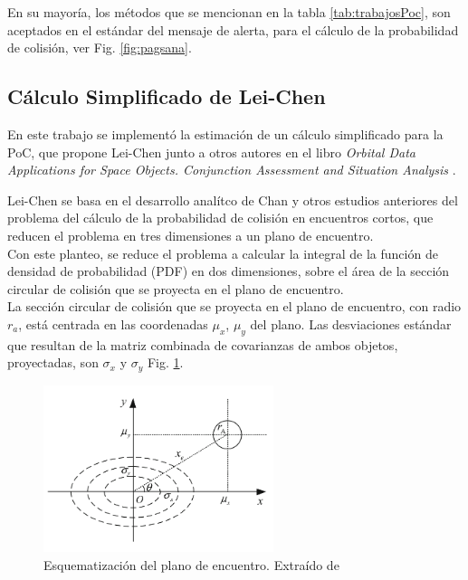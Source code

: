 {En su mayor\'ia, los m\'etodos que se mencionan en la tabla \ref{tab:trabajosPoc}, son aceptados en el est\'andar del mensaje de alerta, para el c\'alculo de la probabilidad de colisi\'on, ver Fig. \ref{fig:pagsana}.

% 
  

\subsection{C\'alculo Simplificado de Lei-Chen}\label{subsec:pocsimp}

En este trabajo se implement\'o la estimaci\'on de un c\'alculo simplificado para la PoC, que propone Lei-Chen junto a otros autores en el libro 
{\it{Orbital Data Applications for Space Objects. Conjunction Assessment and Situation Analysis}} \citep{leichen}.

Lei-Chen se basa en el desarrollo anal\'itco de Chan \citep{chan2003improved} y otros estudios anteriores del problema del c\'alculo de la probabilidad de colisi\'on en encuentros cortos, que reducen el problema en tres dimensiones a un plano de encuentro.\\
Con este planteo, se reduce el problema a calcular la integral de la funci\'on de densidad de probabilidad (PDF) en dos dimensiones, sobre el \'area de la secci\'on circular de colisi\'on que se proyecta en el plano de encuentro.\\

La secci\'on circular de colisi\'on que se proyecta en el plano de encuentro, con radio $r_{a}$, est\'a centrada en las coordenadas $\mu_{x}$, $\mu_{y}$ del plano. Las desviaciones est\'andar que resultan de la matriz combinada de covarianzas de ambos objetos, proyectadas, son $\sigma_{x}$ y $\sigma_{y}$ Fig. \ref{fig:planoenc}.\\

\begin{figure}[!h]
\centering
\includegraphics[width=0.6\textwidth]{imagenes/planodeencuentro}
\caption[Plano de Encuentro]{Esquematizaci\'on del plano de encuentro. Extra\'ido de \cite{leichen}}
\label{fig:planoenc}
\end{figure}

}
